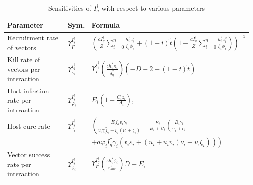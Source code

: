\documentclass[a4paper]{article}
\newcommand{\ciVar }{\xi_{i} }
\newcommand{\fiVar }{\phi_{i} }
\newcommand{\kiVar }{\kappa_{i} }
\newcommand{\biVar }{h_{i} }
\newcommand{\varpiVar}{r_{suc}}
\newcommand{\hatmuVar}{d_q}
\newcommand{\miVar}{\varphi_i}
\newcommand{\starVar}{\dagger}
\begin{document}

\begin{table}[htbp]
\caption{Sensitivities of $I_q^\starVar$ with respect to various parameters}\label{tab.tabvd4}
\begin{tabular}{p{}p{0.8cm}p{9.5cm}}
\hline
Parameter & Sym. &  Formula   \\
\hline
Recruitment rate of vectors &
 $\varUpsilon_\Gamma^{I_q^\starVar}$ & $\left( \frac{a I_q^\starVar}{Z} \sum_{i=0}^n \frac{\biVar ^* z_i^2}{\ciVar \fiVar  } + 
(1-t) \tilde{t}  \left(1 - \frac{a I_q^\starVar}{Z} \sum_{i=0}^n \frac{\biVar ^* z_i^2}{\ciVar \fiVar  } \right) 
\right)^{-1}$\\ 
Kill rate of vectors per interaction & $\varUpsilon_{\kiVar }^{I_q^\starVar}$ 
&$\varUpsilon_{\Gamma}^{I_q^\starVar}\left( \frac{a \biVar ^* \kiVar  }{\hatmuVar^*} \right) \left( -D - 2  +  (1-t)\tilde{t}   \right)$\\

Host infection rate per interaction & $\varUpsilon_{\miVar }^{I_q^\starVar}$  & $E_i   \left(  1 - \frac{C_iz_i}{A_i} \right),$ \\

Host cure rate& 
$\varUpsilon_{\gamma_i}^{I_q^\starVar}$ & 
$\left(\frac{E_i \xi_iv_i \gamma_i}{v_i\gamma_i\widetilde\xi_i+\xi_i(\nu_i+\zeta_i)} - \frac{E_i}{B_i+C_i}\left(\frac{B_i\gamma_i}{\gamma_i+\nu_i} \right. \right.$\\
&~&\qquad $\left. \left. + a\varphi_i I^\dagger_q \gamma_i\left(v_i \varepsilon_i +  (u_i + \bar{u}_i v_i)\nu_i+ u_i\zeta_i \right) \right)\right)$\\

Vector success rate per interaction& $\varUpsilon_{\fiVar }^{I_q^\starVar}$ &
 $\varUpsilon_{\Gamma}^{I_q^\starVar} \left( \frac{a\biVar ^*\fiVar }{\varpiVar^*}\right)D + E_i$\\


\end{tabular}
\end{table}
\end{document}
